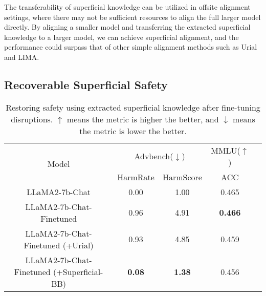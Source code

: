 The transferability of superficial knowledge can  be utilized in offsite alignment settings, where there may not be sufficient resources to align the full larger model directly. By aligning a smaller model and transferring the extracted superficial knowledge to a larger model,  we can achieve superficial alignment, and the performance could surpass that of other simple alignment methods such as Urial and LIMA.








\subsection{Recoverable Superficial Safety}\label{sec:restore}

\begin{table*}[t]
\begin{center}
\begin{tabular}{ccccc}
\toprule
\multirow{2}{*}{Model} &\multicolumn{2}{c}{Advbench($\downarrow$)} & MMLU($\uparrow$)  \\
~& HarmRate & HarmScore & ACC \\
\midrule
LLaMA2-7b-Chat                             & 0.00 & 1.00 & 0.465 \\
LLaMA2-7b-Chat-Finetuned                    & 0.96 & 4.91 & \textbf{0.466} \\
LLaMA2-7b-Chat-Finetuned (+Urial)       & 0.93 & 4.85 & 0.459 \\
LLaMA2-7b-Chat-Finetuned (+Superficial-BB)       & \textbf{0.08} & \textbf{1.38} & 0.456 \\
\bottomrule
\end{tabular}
\end{center}
\caption{Restoring safety using extracted superficial knowledge after fine-tuning disruptions. $\uparrow$ means the metric is higher the better, and $\downarrow$ means the metric is lower the better.}\label{tab:plug}
\end{table*}

